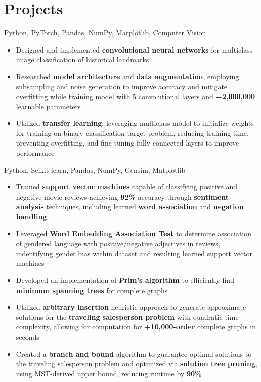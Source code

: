 \documentclass[letterpaper,11pt]{article}
\begin{document}
\section{Projects}
{Python, PyTorch, Pandas, NumPy, Matplotlib, Computer Vision}{}
\begin{itemize}
    \item Designed and implemented \textbf{convolutional neural networks} for multiclass
          image classification of historical landmarks
    \item Researched \textbf{model architecture} and \textbf{data augmentation},
          employing subsampling and noise generation to improve accuracy and mitigate
          overfitting while training model with 5 convolutional layers and
          \textbf{+2,000,000} learnable parameters
    \item Utilized \textbf{transfer learning}, leveraging multiclass model to initialize
          weights for training on binary classification target problem, reducing training
          time, preventing overfitting, and fine-tuning fully-connected layers to improve
          performance
\end{itemize}
{Python, Scikit-learn, Pandas, NumPy, Gensim, Matplotlib}{}
\begin{itemize}
    \item Trained \textbf{support vector machines} capable of classifying positive and
          negative movie reviews achieving \textbf{92\%} accuracy through
          \textbf{sentiment analysis} techniques, including learned \textbf{word
              association} and \textbf{negation handling}
    \item Leveraged \textbf{Word Embedding Association Test} to determine association of
          gendered language with positive/negative adjectives in reviews, indentifying
          gender bias within dataset and resulting learned support vector machines
\end{itemize}
\begin{itemize}
    \item Developed an implementation of \textbf{Prim's algorithm} to efficiently find
          \textbf{minimum spanning trees} for complete graphs
    \item Utilized \textbf{arbitrary insertion} heuristic approach to generate
          approximate solutions for the \textbf{traveling salesperson problem} with
          quadratic time complexity, allowing for computation for \textbf{+10,000-order}
          complete graphs in seconds
    \item Created a \textbf{branch and bound} algorithm to guarantee optimal solutions to
          the traveling salesperson problem and optimized via \textbf{solution tree
              pruning}, using MST-derived upper bound, reducing runtime by \textbf{90\%}
\end{itemize}
\end{document}
